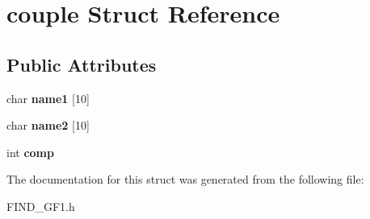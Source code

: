 \hypertarget{structcouple}{}\section{couple Struct Reference}
\label{structcouple}
\subsection*{Public Attributes}
\begin{DoxyCompactItemize}
\item 
\mbox{\label{structcouple_a9d1fb6b20757287852e7bedb702c32f7}} 
char {\bfseries name1} \mbox{[}10\mbox{]}
\item 
\mbox{\label{structcouple_af556c7451b28974deefa0f995b9e7f99}} 
char {\bfseries name2} \mbox{[}10\mbox{]}
\item 
\mbox{\label{structcouple_a6cdd0405460995565bcae32f66cd8b74}} 
int {\bfseries comp}
\end{DoxyCompactItemize}


The documentation for this struct was generated from the following file\+:\begin{DoxyCompactItemize}
\item 
F\+I\+N\+D\+\_\+\+G\+F1.\+h\end{DoxyCompactItemize}
